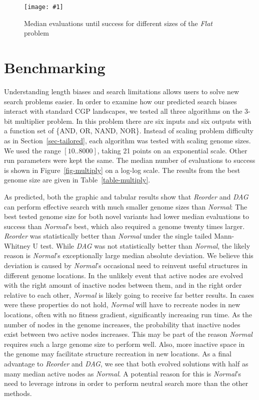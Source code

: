 \documentclass{sig-alternate}
\newcommand{\includegraphicsfit}[1]
{\texttt{[image: \#1]}}
\begin{document}
\begin{figure}
  \centering
  \includegraphicsfit{flat}
  \caption{Median evaluations until success for different sizes of the \emph{Flat} problem} 
  \label{fig-flat}
\end{figure}

\section{Benchmarking}
\label{sec-benchmarking}
Understanding length biases and search limitations allows users to
solve new search problems easier.  In order to examine how our predicted search biases
interact with standard CGP landscapes, we tested all three algorithms on the 3-bit
multiplier problem.  In this problem there are six inputs and six outputs with
a function set of \{AND, OR, NAND, NOR\}.  Instead of scaling problem difficulty
as in Section~\ref{sec-tailored}, each algorithm was tested with scaling genome
sizes.  We used the range $\left [ 10 .. 8000 \right ]$, taking 21 points on an
exponential scale.  Other run parameters were kept the same.
The median number of evaluations to success is shown in
Figure~\ref{fig-multiply} on a log-log scale.  The results from the best genome
size are given in Table~\ref{table-multiply}.

As predicted, both the graphic and tabular results show that \emph{Reorder} and
\emph{DAG} can perform effective search with much smaller genome sizes than \emph{Normal}:
The best tested genome size for both novel
variants had lower median evaluations to success than \emph{Normal}'s best, which
also required a genome twenty times larger.  \emph{Reorder} was statistically
better than \emph{Normal} under the single tailed Mann-Whitney U test. While \emph{DAG} was not
statistically better than \emph{Normal}, the likely reason is \emph{Normal}'s exceptionally large median
absolute deviation.  We believe this deviation is caused by \emph{Normal}'s occasional need to
reinvent useful structures in different genome locations.  In the unlikely event that
active nodes are evolved with the right amount of inactive nodes between them, and in the
right order relative to each other, \emph{Normal} is likely going to receive far better
results.  In cases were these properties do not hold, \emph{Normal} will
have to recreate nodes in new locations, often with no fitness gradient, significantly
increasing run time.  As the number of nodes in the genome increases, the probability
that inactive nodes exist between two active nodes increases.  This may be part of
the reason \emph{Normal} requires such a large genome size to perform well.
Also, more inactive space in the genome may facilitate structure recreation in new locations.
As a final advantage to \emph{Reorder} and \emph{DAG}, we see that both evolved
solutions with half as many median active nodes as \emph{Normal}.  A potential
reason for this is \emph{Normal}'s need to leverage introns in order to perform
neutral search more than the other methods.
\end{document}
